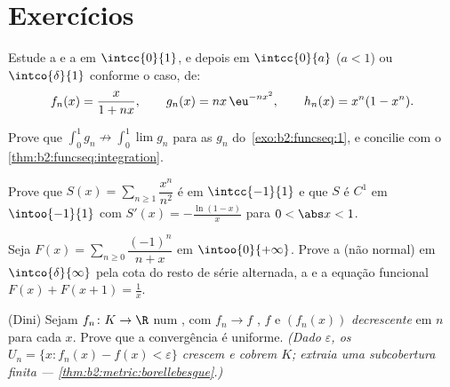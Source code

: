 \section{Exercícios}

\begin{exercise}[$\star$]\label{exo:b2:funcseq:1}
Estude a  e a  em $\intcc{0}{1}$, e depois
em $\intcc{0}{a}$ ($a < 1$) ou $\intco{\delta}{1}$ conforme o caso, de:
\[
f_n(x) = \frac{x}{1 + nx},
\qquad
g_n(x) = n x\,\eu^{-n x^2},
\qquad
h_n(x) = x^n(1 - x^n).
\]
\end{exercise}

\begin{exercise}[$\star$]\label{exo:b2:funcseq:2}
Prove que $\displaystyle\int_0^1 g_n \not\to \int_0^1 \lim g_n$
para as $g_n$ do~\cref{exo:b2:funcseq:1}, e concilie com o
\cref{thm:b2:funcseq:integration}.
\end{exercise}

\begin{exercise}[$\star$]\label{exo:b2:funcseq:3}
Prove que $S(x) = \sum_{n\geq1} \dfrac{x^n}{n^2}$ é  em
$\intcc{-1}{1}$ e que $S$ é $C^1$ em $\intoo{-1}{1}$ com
$S'(x) = -\frac{\ln(1-x)}{x}$ para $0 < \abs x < 1$.
\end{exercise}

\begin{exercise}[$\star\star$]\label{exo:b2:funcseq:4}
Seja $F(x) = \sum_{n \geq 0} \dfrac{(-1)^n}{n + x}$ em
$\intoo{0}{+\infty}$. Prove a  (não normal) em
$\intco{\delta}{\infty}$ pela cota do resto de série alternada,
a  e a equação funcional $F(x) + F(x + 1) =
\frac1x$.
\end{exercise}

\begin{exercise}[$\star\star$]\label{exo:b2:funcseq:5}
(Dini) Sejam $f_n \colon K \to \R$  num \emph{}, com $f_n \to f$ \emph{}, $f$ 
e $(f_n(x))$ \emph{decrescente} em $n$ para cada $x$. Prove que
a convergência é uniforme. \emph{(Dado $\varepsilon$, os 
$U_n = \{x : f_n(x) - f(x) < \varepsilon\}$ crescem e cobrem
$K$; extraia uma subcobertura finita ---
\cref{thm:b2:metric:borellebesgue}.)}
\end{exercise}

